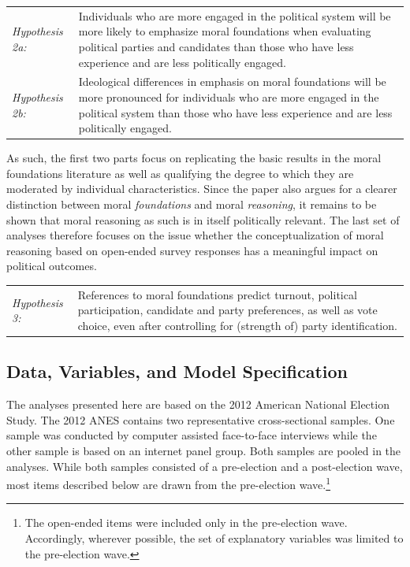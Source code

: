 \documentclass[12pt]{article}
\begin{document}
\vspace{0.3cm}
\begin{tabular}{lp{12cm}}
\textsl{Hypothesis 2a:} & Individuals who are more engaged in the political system will be more likely to emphasize moral foundations when evaluating political parties and candidates than those who have less experience and are less politically engaged. \\
\textsl{Hypothesis 2b:} & Ideological differences in emphasis on moral foundations will be more pronounced for individuals who are more engaged in the political system than those who have less experience and are less politically engaged.
\end{tabular}
\vspace{0.5cm}

As such, the first two parts focus on replicating the basic results in the moral foundations literature as well as qualifying the degree to which they are moderated by individual characteristics. Since the paper also argues for a clearer distinction between moral \textit{foundations} and moral \textit{reasoning}, it remains to be shown that moral reasoning as such is in itself politically relevant. The last set of analyses therefore focuses on the issue whether the conceptualization of moral reasoning based on open-ended survey responses has a meaningful impact on political outcomes.

\vspace{0.3cm}
\begin{tabular}{lp{12cm}}
\textsl{Hypothesis 3:} & References to moral foundations predict turnout, political participation, candidate and party preferences, as well as vote choice, even after controlling for (strength of) party identification.
\end{tabular}
\vspace{0.5cm}


\subsection{Data, Variables, and Model Specification}

The analyses presented here are based on the 2012 American National Election Study. The 2012 ANES contains two representative cross-sectional samples. One sample was conducted by computer assisted face-to-face interviews while the other sample is based on an internet panel group. Both samples are pooled in the analyses. While both samples consisted of a pre-election and a post-election wave, most items described below are drawn from the pre-election wave.\footnote{The open-ended items were included only in the pre-election wave. Accordingly, wherever possible, the set of explanatory variables was limited to the pre-election wave.}
\end{document}
